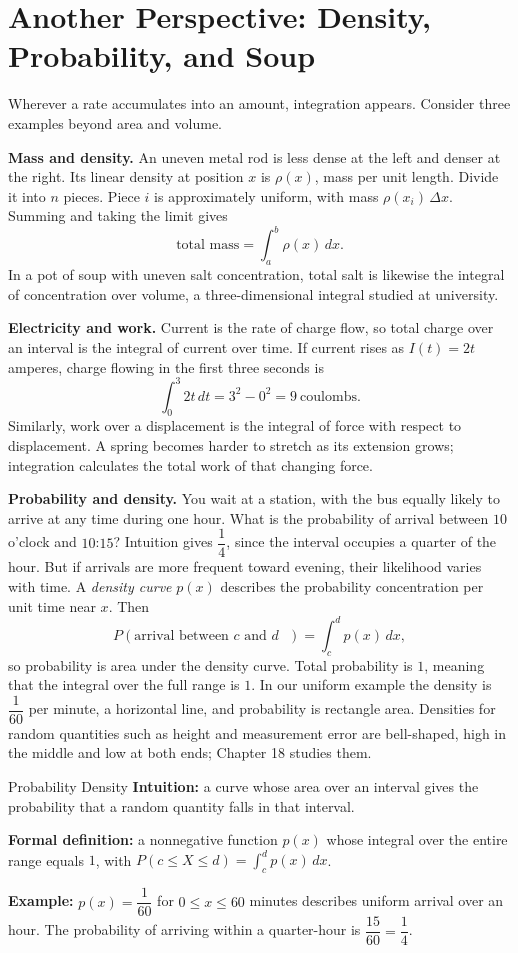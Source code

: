 \section{Another Perspective: Density, Probability, and Soup}

Wherever a rate accumulates into an amount, integration appears. Consider three examples beyond area and volume.

\textbf{Mass and density.} An uneven metal rod is less dense at the left and denser at the right. Its linear density at position $x$ is $\rho(x)$, mass per unit length. Divide it into $n$ pieces. Piece $i$ is approximately uniform, with mass $\rho(x_i)\,\Delta x$. Summing and taking the limit gives
\[
\text{total mass}=\int_a^b \rho(x)\,dx .
\]
In a pot of soup with uneven salt concentration, total salt is likewise the integral of concentration over volume, a three-dimensional integral studied at university.

\textbf{Electricity and work.} Current is the rate of charge flow, so total charge over an interval is the integral of current over time. If current rises as $I(t)=2t$ amperes, charge flowing in the first three seconds is
\[
\int_0^3 2t\,dt=3^{2}-0^{2}=9\ \text{coulombs} .
\]
Similarly, work over a displacement is the integral of force with respect to displacement. A spring becomes harder to stretch as its extension grows; integration calculates the total work of that changing force.

\textbf{Probability and density.} You wait at a station, with the bus equally likely to arrive at any time during one hour. What is the probability of arrival between $10$ o'clock and $10$:$15$? Intuition gives $\dfrac14$, since the interval occupies a quarter of the hour. But if arrivals are more frequent toward evening, their likelihood varies with time. A \emph{density curve} $p(x)$ describes the probability concentration per unit time near $x$. Then
\[
P(\text{arrival between }c\text{ and }d\text{ })=\int_c^d p(x)\,dx ,
\]
so probability is area under the density curve. Total probability is $1$, meaning that the integral over the full range is $1$. In our uniform example the density is $\dfrac{1}{60}$ per minute, a horizontal line, and probability is rectangle area. Densities for random quantities such as height and measurement error are bell-shaped, high in the middle and low at both ends; Chapter 18 studies them.

\begin{shuyu}{Probability Density}
\textbf{Intuition:} a curve whose area over an interval gives the probability that a random quantity falls in that interval.

\textbf{Formal definition:} a nonnegative function $p(x)$ whose integral over the entire range equals $1$, with $P(c\le X\le d)=\int_c^d p(x)\,dx$.

\textbf{Example:} $p(x)=\dfrac1{60}$ for $0\le x\le 60$ minutes describes uniform arrival over an hour. The probability of arriving within a quarter-hour is $\dfrac{15}{60}=\dfrac14$.
\end{shuyu}

